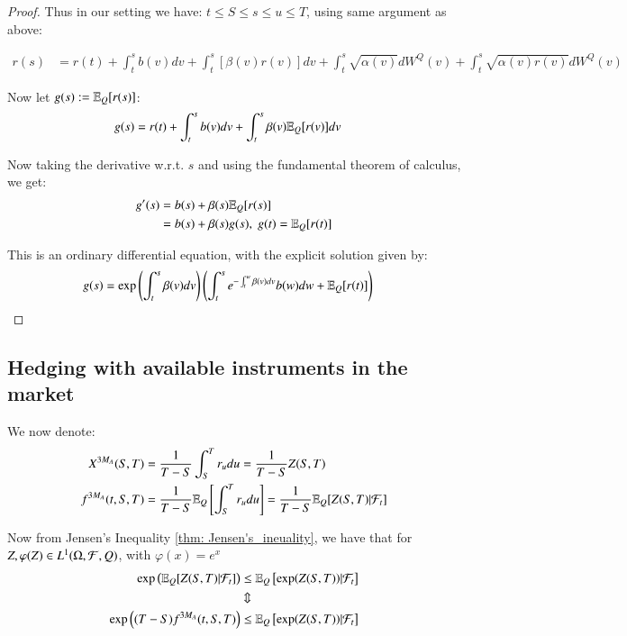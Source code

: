\begin{proof}
Thus in our setting we have: $t\leq S \leq s \leq u \leq T$, using same argument as above: 

\begin{align*}
r(s) &= r(t) + \int_{t}^{s}b(v)dv + \int_{t}^{s}[\beta(v)r(v)]dv
+ \int_{t}^{s}\sqrt{\alpha(v)}dW^{Q}(v)
+ \int_{t}^{s}\sqrt{\alpha(v)r(v)}dW^{Q}(v)    
\end{align*}

Now let $g(s) := \mathbb{E}_{Q}[r(s)]$: 
\begin{align*}
g(s) &= r(t) + \int_{t}^{s}b(v)dv + \int_{t}^{s}\beta(v)\mathbb{E}_{Q}[r(v)]dv
\end{align*}

Now taking the derivative w.r.t. $s$ and using the fundamental theorem of calculus, we get: 
\begin{align*}
g'(s) &= b(s) + \beta(s)\mathbb{E}_{Q}[r(s)] \\ 
&= b(s) + \beta(s)g(s), \; g(t) = \mathbb{E}_{Q}[r(t)]
\end{align*}

This is an ordinary differential equation, with the explicit solution given by:
\begin{align*}
 g(s) &= \exp\left(
 \int_{t}^{s}\beta(v)dv
 \right)
 \left(
 \int_{t}^{s}e^{-\int_{t}^{w}\beta(v)dv}b(w)dw + \mathbb{E}_{Q}[r(t)]
 \right)
\end{align*}
\end{proof}


\subsection{Hedging with available instruments in the market}

We now denote: 
\begin{align*}
X^{3M_{A}}(S,T) &= \frac{1}{T-S}\int_{S}^{T}r_{u}du = \frac{1}{T-S}Z(S,T) \\ 
f^{3M_{A}}(t,S,T) &= \frac{1}{T-S}\mathbb{E}_{Q}\left[
\int_{S}^{T}r_{u}du
\right] = \frac{1}{T-S}\mathbb{E}_{Q}[Z(S,T)|\mathcal{F}_{t}]
\end{align*}

Now from Jensen's Inequality \ref{thm: Jensen's_ineuality}, we have that for $Z, \varphi(Z) \in L^{1}(\Omega, \mathcal{F}, Q)$, with $\varphi(x) = e^{x}$
\begin{align}
\label{eq: hedging_availible_inst_market_1}
\exp\left(
\mathbb{E}_{Q}[Z(S,T)|\mathcal{F}_{t}]
\right)
&\leq 
\mathbb{E}_{Q}\left[
\exp(Z(S,T))|\mathcal{F}_{t}
\right] \nonumber \\ 
&\Updownarrow \nonumber \\ 
\exp\left(
(T-S)f^{3M_{A}}(t,S,T)
\right) 
&\leq 
\mathbb{E}_{Q}\left[\exp(Z(S,T))|\mathcal{F}_{t}\right]
\end{align} 

